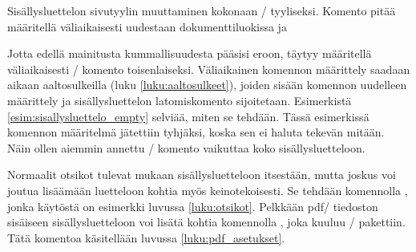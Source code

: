 \begin{esimerkki*}

\begin{koodilohko}
\pagestyle{empty}
{
  \renewcommand{\thispagestyle}[1]{} %
  \tableofcontents
}
\end{koodilohko}
  \caption{Sisällysluettelon sivutyylin muuttaminen kokonaan
    \-/ tyyliseksi. Komento  pitää
    määritellä väliaikaisesti uudestaan dokumenttiluokissa 
    ja }
  \label{esim:sisallysluettelo_empty}
\end{esimerkki*}

Jotta edellä mainitusta kummallisuudesta pääsisi eroon, täytyy
määritellä väliaikaisesti \-/ komento
toisenlaiseksi. Väliaikainen komennon määrittely saadaan aikaan
aaltosulkeilla (luku \ref{luku:aaltosulkeet}), joiden sisään komennon
uudelleen määrittely ja sisällysluettelon latomiskomento sijoitetaan.
Esimerkistä \ref{esim:sisallysluettelo_empty} selviää, miten se tehdään.
Tässä esimerkissä komennon määritelmä jätettiin tyhjäksi, koska sen ei
haluta tekevän mitään. Näin ollen aiemmin annettu \-/
komento vaikuttaa koko sisällysluetteloon.

Normaalit otsikot tulevat mukaan sisällysluetteloon itsestään, mutta
joskus voi joutua lisäämään luetteloon kohtia myös keinotekoisesti. Se
tehdään komennolla , jonka käytöstä on
esimerkki luvussa \ref{luku:otsikot}. Pelkkään pdf\-/ tiedoston
sisäiseen sisällysluetteloon voi lisätä kohtia komennolla
, joka kuuluu \-/ pakettiin.
Tätä komentoa käsitellään luvussa \ref{luku:pdf_asetukset}.

